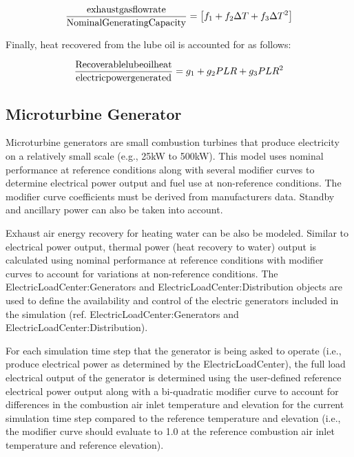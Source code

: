 \begin{equation}
\frac{{{\rm{exhaust gas flow rate}}}}{{{\rm{Nominal Generating Capacity}}}} = \left[ {{f_1} + {f_2}\Delta T + {f_3}\Delta {T^2}} \right]
\end{equation}

Finally, heat recovered from the lube oil is accounted for as follows:

\begin{equation}
\frac{{{\rm{Recoverable lube oil heat}}}}{{{\rm{electric power generated}}}} = {g_1} + {g_2}PLR + {g_3}PL{R^2}
\end{equation}

\subsection{Microturbine Generator}\label{microturbine-generator}

Microturbine generators are small combustion turbines that produce electricity on a relatively small scale (e.g., 25kW to 500kW). This model uses nominal performance at reference conditions along with several modifier curves to determine electrical power output and fuel use at non-reference conditions. The modifier curve coefficients must be derived from manufacturers data. Standby and ancillary power can also be taken into account.

Exhaust air energy recovery for heating water can be also be modeled. Similar to electrical power output, thermal power (heat recovery to water) output is calculated using nominal performance at reference conditions with modifier curves to account for variations at non-reference conditions. The ElectricLoadCenter:Generators and ElectricLoadCenter:Distribution objects are used to define the availability and control of the electric generators included in the simulation (ref. ElectricLoadCenter:Generators and ElectricLoadCenter:Distribution).

For each simulation time step that the generator is being asked to operate (i.e., produce electrical power as determined by the ElectricLoadCenter), the full load electrical output of the generator is determined using the user-defined reference electrical power output along with a bi-quadratic modifier curve to account for differences in the combustion air inlet temperature and elevation for the current simulation time step compared to the reference temperature and elevation (i.e., the modifier curve should evaluate to 1.0 at the reference combustion air inlet temperature and reference elevation).


